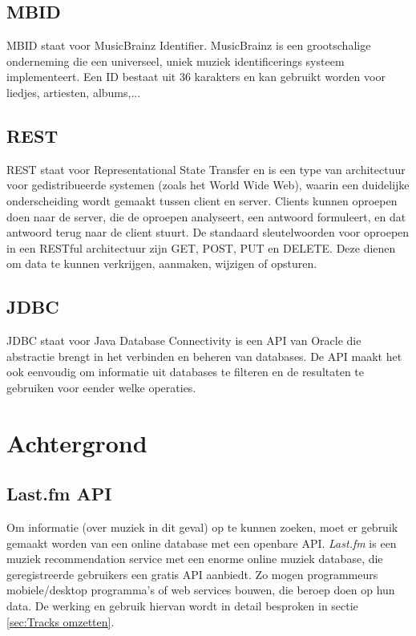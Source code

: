 \documentclass[11pt,a4paper]{article}
\begin{document}
		\subsection{MBID}
		\label{sec:MBID}
		MBID staat voor MusicBrainz Identifier. MusicBrainz is een grootschalige onderneming die een universeel, uniek muziek identificerings systeem implementeert. Een ID bestaat uit 36 karakters en kan gebruikt worden voor liedjes, artiesten, albums,...
	
		\subsection{REST}
		\label{sec:REST}
		REST staat voor Representational State Transfer en is een type van architectuur voor gedistribueerde systemen (zoals het World Wide Web), waarin een duidelijke onderscheiding wordt gemaakt tussen client en server. Clients kunnen oproepen doen naar de server, die de oproepen analyseert, een antwoord formuleert, en dat antwoord terug naar de client stuurt. De standaard sleutelwoorden voor oproepen in een RESTful architectuur zijn GET, POST, PUT en DELETE. Deze dienen om data te kunnen verkrijgen, aanmaken, wijzigen of opsturen.
		
		\subsection{JDBC}
		JDBC staat voor Java Database Connectivity is een API van Oracle die abstractie brengt in het verbinden en beheren van databases. De API maakt het ook eenvoudig om informatie uit databases te filteren en de resultaten te gebruiken voor eender welke operaties.
		
\section{Achtergrond}
\label{sec:Achtergrond}
	\subsection{Last.fm API}
	\label{sec:Last.fm API}
Om informatie (over muziek in dit geval) op te kunnen zoeken, moet er gebruik gemaakt worden van een online database met een openbare API. \textit{Last.fm} is een muziek recommendation service met een enorme online muziek database, die geregistreerde gebruikers een gratis API aanbiedt. Zo mogen programmeurs mobiele/desktop programma's of web services bouwen, die beroep doen op hun data. De werking en gebruik hiervan wordt in detail besproken in sectie \ref{sec:Tracks omzetten}.
\end{document}
